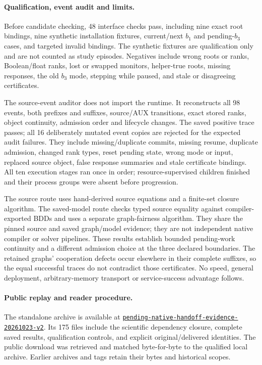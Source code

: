 \paragraph{Qualification, event audit and limits.}
Before candidate checking, 48 interface checks pass, including nine
exact root bindings, nine synthetic installation fixtures, current/next
$b_1$ and pending-$b_3$ cases, and targeted invalid bindings. The synthetic
fixtures are qualification only and are not counted as study episodes.
Negatives include wrong roots or ranks, Boolean/float ranks, lost or
swapped monitors, helper-true roots, missing responses, the old $b_3$
mode, stepping while paused, and stale or disagreeing certificates.

The source-event auditor does not import the runtime. It reconstructs
all 98 events, both prefixes and suffixes, source/AUX transitions, exact
stored ranks, object continuity, admission order and lifecycle changes.
The saved positive trace passes; all 16 deliberately mutated event
copies are rejected for the expected audit failures. They include
missing/duplicate commits, missing resume, duplicate admission, changed
rank types, reset pending state, wrong mode or input, replaced source
object, false response summaries and stale certificate bindings.
All ten execution stages ran once in order; resource-supervised children
finished and their process groups were absent before progression.

The source route uses hand-derived source equations and a finite-set
closure algorithm. The saved-model route checks typed source equality
against compiler-exported BDDs and uses a separate graph-fairness
algorithm. They share the pinned source and saved graph/model evidence;
they are not independent native compiler or solver pipelines. These
results establish bounded pending-work continuity and a different
admission choice at the three declared boundaries. The retained graphs'
cooperation defects occur elsewhere in their complete suffixes, so the
equal successful traces do not contradict those certificates. No speed,
general deployment, arbitrary-memory transport or service-success
advantage follows.

\paragraph{Public replay and reader procedure.}
The standalone archive
 is available at
\href{https://github.com/research-artifact-archive/seams2027/tree/pending-native-handoff-evidence-20261023-v2}{\nolinkurl{pending-native-handoff-evidence-20261023-v2}}.
Its 175 files include the scientific dependency closure, complete saved
results, qualification controls, and explicit original/delivered identities.
The public download was retrieved and matched byte-for-byte to the
qualified local archive. Earlier archives and tags retain their bytes
and historical scopes.

